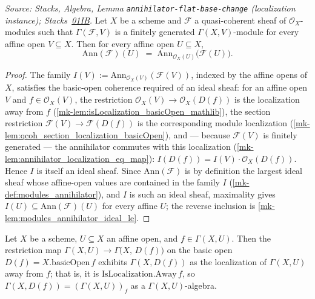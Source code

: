 \begin{lemma}\label{mk-lem:modules_annihilator_ideal}
  \leanok

  \textit{Source: Stacks, Algebra, Lemma \texttt{annihilator-flat-base-change}
  (localization instance);
  Stacks~\href{https://stacks.math.columbia.edu/tag/01IB}{01IB}.}
  Let \(X\) be a scheme and \(\mathcal{F}\) a quasi-coherent sheaf of
  \(\mathcal{O}_X\)-modules such that \(\Gamma(\mathcal{F}, V)\) is a finitely
  generated \(\Gamma(X, V)\)-module for every affine open \(V \subseteq X\).
  Then for every affine open \(U \subseteq X\),
  \[
    \mathrm{Ann}(\mathcal{F})(U)
    \;=\; \mathrm{Ann}_{\mathcal{O}_X(U)}\bigl(\mathcal{F}(U)\bigr).
  \]
\end{lemma}
\begin{proof}
  \leanok{}
  The family \(I(V) := \mathrm{Ann}_{\mathcal{O}_X(V)}(\mathcal{F}(V))\),
  indexed by the affine opens of \(X\), satisfies the basic-open coherence
  required of an ideal sheaf: for an affine open \(V\) and
  \(f \in \mathcal{O}_X(V)\), the restriction
  \(\mathcal{O}_X(V) \to \mathcal{O}_X(D(f))\) is the localization away from
  \(f\) (\ref{mk-lem:isLocalization_basicOpen_mathlib}), the section restriction
  \(\mathcal{F}(V) \to \mathcal{F}(D(f))\) is the corresponding module
  localization (\ref{mk-lem:qcoh_section_localization_basicOpen}), and — because
  \(\mathcal{F}(V)\) is finitely generated — the annihilator commutes with this
  localization (\ref{mk-lem:annihilator_localization_eq_map}):
  \(I(D(f)) = I(V) \cdot \mathcal{O}_X(D(f))\).  Hence \(I\) is itself an
  ideal sheaf.  Since \(\mathrm{Ann}(\mathcal{F})\) is by definition the
  largest ideal sheaf whose affine-open values are contained in the family
  \(I\) (\ref{mk-def:modules_annihilator}), and \(I\) is such an ideal sheaf,
  maximality gives \(I(U) \subseteq \mathrm{Ann}(\mathcal{F})(U)\) for every
  affine \(U\); the reverse inclusion is
  \ref{mk-lem:modules_annihilator_ideal_le}.
\end{proof}


\begin{lemma}
  \label{mk-lem:isLocalization_basicOpen_mathlib}
  \mathlibok

  Let \(X\) be a scheme, \(U \subseteq X\) an affine open, and
  \(f \in \Gamma(X, U)\). Then the restriction map
  \(\Gamma(X, U) \to \Gamma\bigl(X,\, D(f)\bigr)\) on the basic open
  \(D(f) = X.\mathrm{basicOpen}\,f\) exhibits \(\Gamma(X, D(f))\) as the
  localization of \(\Gamma(X, U)\) away from \(f\); that is, it is
  \(\mathrm{IsLocalization.Away}\,f\), so
  \(\Gamma(X, D(f)) = (\Gamma(X, U))_f\) as a \(\Gamma(X,U)\)-algebra.
\end{lemma}

